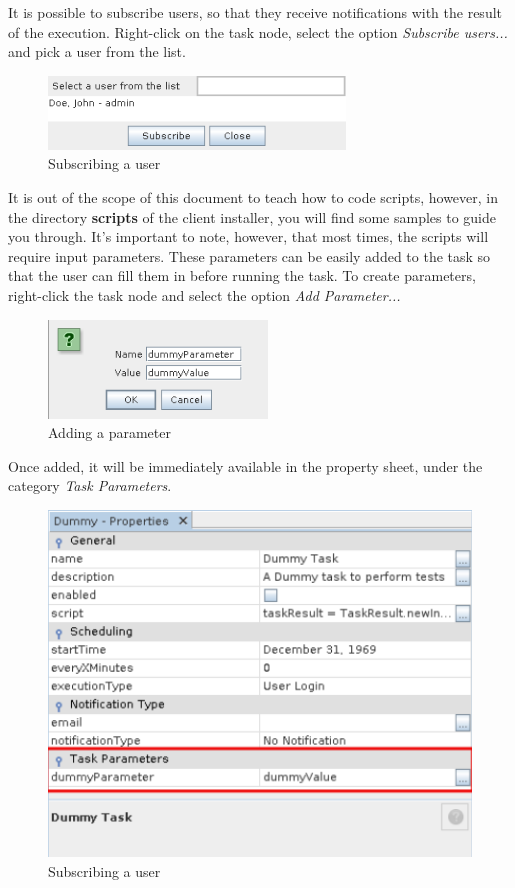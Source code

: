 \documentclass[a4paper]{article}
\begin{document}
		It is possible to subscribe users, so that they receive notifications with the result of the execution. Right-click on the task node, select the option \textit{Subscribe users...} and pick a user from the list.
		\begin{figure}[h!]
			\centering
			\includegraphics[width=0.3\linewidth]{img/task_manager_subscribe_users.png}
			\caption{Subscribing a user}
			\label{fig:task_manager_subscribe_users}
		\end{figure}
		
		It is out of the scope of this document to teach how to code scripts, however, in the directory \textbf{scripts} of the client installer, you will find some samples to guide you through. It's important to note, however, that most  times, the scripts will require input parameters. These parameters can be easily added to the task so that the user can fill them in before running the task. To create parameters, right-click the task node and select the option \textit{Add Parameter...}
		\begin{figure}[h!]
			\centering
			\includegraphics[width=0.3\linewidth]{img/task_manager_add_parameter.png}
			\caption{Adding a parameter}
			\label{fig:task_manager_add_parameter}
		\end{figure}
		
		Once added, it will be immediately available in the property sheet, under the category \textit{Task Parameters}.
		\begin{figure}[h!]
			\centering
			\includegraphics[width=0.5\linewidth]{img/task_manager_property_sheet.png}
			\caption{Subscribing a user}
			\label{fig:task_manager_property_sheet}
		\end{figure}
		
\end{document}
